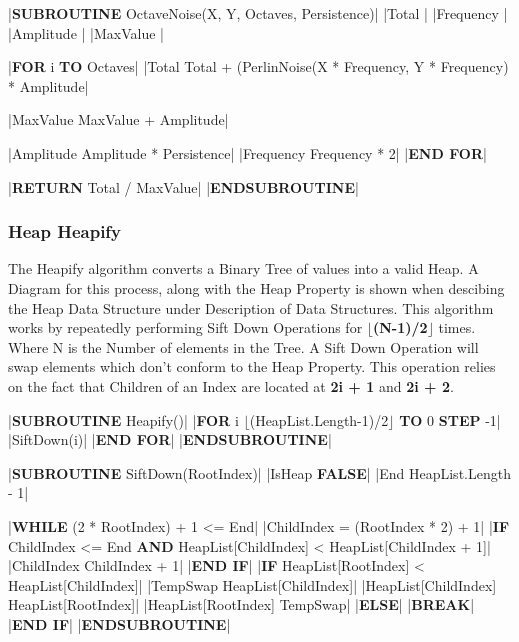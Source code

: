\begin{flushleft}
                \vspace{0.2cm}
                \begin{pseudocode}
|\textbf{SUBROUTINE} OctaveNoise(X, Y, Octaves, Persistence)|
    |Total |
    |Frequency |
    |Amplitude |
    |MaxValue |

    |\textbf{FOR} i  \textbf{TO} Octaves|
        |Total \leftarrow Total + (PerlinNoise(X * Frequency, Y * Frequency) * Amplitude|

        |MaxValue \leftarrow MaxValue + Amplitude|

        |Amplitude \leftarrow Amplitude * Persistence|
        |Frequency \leftarrow Frequency * 2|
    |\textbf{END FOR}|

    |\textbf{RETURN} Total / MaxValue|
|\textbf{ENDSUBROUTINE}|            
                \end{pseudocode}
            \subsubsection{Heap Heapify}
                The Heapify algorithm converts a Binary Tree of values into a valid Heap. A Diagram for this process, along with the Heap Property is shown when descibing the Heap 
                Data Structure under Description of Data Structures. This algorithm works by repeatedly performing Sift Down Operations for \textbf{$\lfloor$(N-1)/2$\rfloor$} times.
                Where N is the Number of elements in the Tree. A Sift Down Operation will swap elements which don't conform to the Heap Property.
                This operation relies on the fact that Children of an Index are located at \textbf{2i + 1} and \textbf{2i + 2}.
                \vspace{0.2cm}

                \begin{pseudocode} 
|\textbf{SUBROUTINE} Heapify()|
    |\textbf{FOR} i \leftarrow $\lfloor$(HeapList.Length-1)/2$\rfloor$ \textbf{TO} 0 \textbf{STEP} -1|
        |SiftDown(i)|
    |\textbf{END FOR}|
|\textbf{ENDSUBROUTINE}| 

|\textbf{SUBROUTINE} SiftDown(RootIndex)|
    |IsHeap \leftarrow \textbf{FALSE}|
    |End \leftarrow HeapList.Length - 1|

    |\textbf{WHILE} (2 * RootIndex) + 1 <= End|
        |ChildIndex = (RootIndex * 2) + 1|
        |\textbf{IF} ChildIndex <= End \textbf{AND} HeapList[ChildIndex] < HeapList[ChildIndex + 1]|
            |ChildIndex \leftarrow ChildIndex + 1|
        |\textbf{END IF}|
        |\textbf{IF} HeapList[RootIndex] < HeapList[ChildIndex]|
            |TempSwap \leftarrow HeapList[ChildIndex]|
            |HeapList[ChildIndex] \leftarrow HeapList[RootIndex]|
            |HeapList[RootIndex] \leftarrow TempSwap|
        |\textbf{ELSE}|   
            |\textbf{BREAK}|
        |\textbf{END IF}|
|\textbf{ENDSUBROUTINE}| 
                \end{pseudocode}


\end{flushleft}
